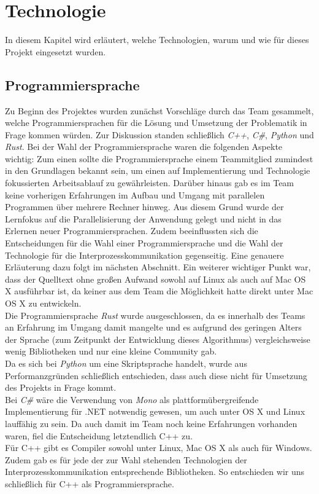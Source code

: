 \documentclass[12pt,a4paper]{scrreprt}
\begin{document}
\chapter{Technologie}
\label{chap:technologie}

In diesem Kapitel wird erläutert, welche Technologien, warum und wie für dieses Projekt eingesetzt wurden.

\section{Programmiersprache}
\label{sec:programmiersprache}

Zu Beginn des Projektes wurden zunächst Vorschläge durch das Team gesammelt, welche Programmiersprachen für die Lösung und Umsetzung der Problematik in Frage kommen würden. Zur Diskussion standen schließlich \textit{C++}, \textit{C\#}, \textit{Python} und \textit{Rust}. Bei der Wahl der Programmiersprache waren die folgenden Aspekte wichtig: Zum einen sollte die Programmiersprache einem Teammitglied zumindest in den Grundlagen bekannt sein, um einen auf Implementierung und Technologie fokussierten Arbeitsablauf zu gewährleisten. Darüber hinaus gab es im Team keine vorherigen Erfahrungen im Aufbau und Umgang mit parallelen Programmen über mehrere Rechner hinweg. Aus diesem Grund wurde der Lernfokus auf die Parallelisierung der Anwendung gelegt und nicht in das Erlernen neuer Programmiersprachen. Zudem beeinflussten sich die Entscheidungen für die Wahl einer Programmiersprache und die Wahl der Technologie für die Interprozesskommunikation gegenseitig. Eine genauere Erläuterung dazu folgt im nächsten Abschnitt. Ein weiterer wichtiger Punkt war, dass der Quelltext ohne großen Aufwand sowohl auf Linux als auch auf Mac OS X ausführbar ist, da keiner aus dem Team die Möglichkeit hatte direkt unter Mac OS X zu entwickeln.\\
Die Programmiersprache \textit{Rust} wurde ausgeschlossen, da es innerhalb des Teams an Erfahrung im Umgang damit mangelte und es aufgrund des geringen Alters der Sprache (zum Zeitpunkt der Entwicklung dieses Algorithmus) vergleichsweise wenig Bibliotheken und nur eine kleine Community gab.\\
Da es sich bei \textit{Python} um eine Skriptsprache handelt, wurde aus Performanzgründen schließlich entschieden, dass auch diese nicht für Umsetzung des Projekts in Frage kommt.\\
Bei \textit{C\#} wäre die Verwendung von \textit{Mono} als plattformübergreifende Implementierung für .NET notwendig gewesen, um auch unter OS X und Linux lauffähig zu sein. Da auch damit im Team noch keine Erfahrungen vorhanden waren, fiel die Entscheidung letztendlich C++ zu.\\
Für C++ gibt es Compiler sowohl unter Linux, Mac OS X als auch für Windows. Zudem gab es für jede der zur Wahl stehenden Technologien der Interprozesskommunikation entsprechende Bibliotheken. So entschieden wir uns schließlich für C++ als Programmiersprache.
\end{document}
